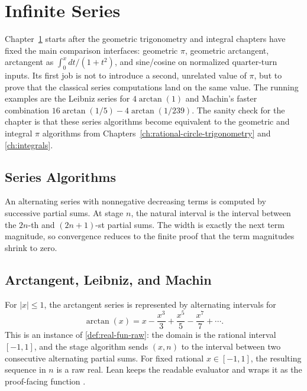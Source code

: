 \chapter{Infinite Series}
\label{ch:infinite-series}

Chapter~\ref{ch:infinite-series} starts after the geometric trigonometry and
integral chapters have fixed the main comparison interfaces: geometric \(\pi\),
geometric arctangent, arctangent as \(\int_0^x dt/(1+t^2)\), and sine/cosine
on normalized quarter-turn inputs.  Its first job is not to introduce a second,
unrelated value of \(\pi\), but to prove that the classical series
computations land on the same value.  The running examples are the Leibniz
series for \(4\arctan(1)\) and Machin's faster combination
\(16\arctan(1/5)-4\arctan(1/239)\).  The sanity check for the chapter is
that these series algorithms become equivalent to the geometric and integral
\(\pi\) algorithms from Chapters~\ref{ch:rational-circle-trigonometry} and
\ref{ch:integrals}.


\section{Series Algorithms}

\begin{definition}
\label{def:alternating-series-intervals}
An alternating series with nonnegative decreasing terms is computed by
successive partial sums.  At stage \(n\), the natural interval is the interval
between the \(2n\)-th and \((2n+1)\)-st partial sums.  The width is exactly
the next term magnitude, so convergence reduces to the finite proof that the
term magnitudes shrink to zero.
\end{definition}

\section{Arctangent, Leibniz, and Machin}

\begin{definition}\label{def:arctan-series}
For \(|x|\le 1\), the arctangent series is represented by alternating
intervals for
\[
  \arctan(x)=
  x-\frac{x^3}{3}+\frac{x^5}{5}-\frac{x^7}{7}+\cdots .
\]
This is an instance of \cref{def:real-fun-raw}: the domain is the rational
interval \([-1,1]\), and the stage algorithm sends \((x,n)\) to the interval
between two consecutive alternating partial sums.  For fixed rational
\(x\in[-1,1]\), the resulting sequence in \(n\) is a raw real.  Lean keeps the
readable evaluator  and wraps it as the
proof-facing function .
\end{definition}

